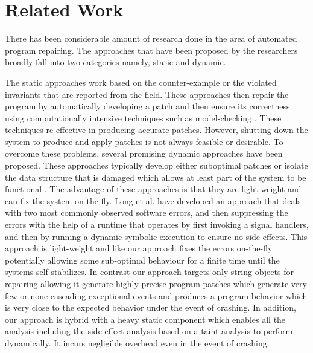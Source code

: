 \section{Related Work}
\label{sec:relatedWork}

There has been considerable amount of research done in the area of 
automated program repairing. The approaches that have been proposed by the researchers
broadly fall into two categories namely, static and dynamic.

The static approaches work based on the counter-example or the violated invariants that
are reported from the field. These approaches then repair the program by automatically developing a patch
and then ensure its correctness using computationally intensive techniques such as model-checking \cite{biere2014, wei-issta-2010}.
These techniques re effective in producing accurate patches. However, shutting down the system to produce and apply patches is not always feasible 
or desirable. To overcome these problems, several promising dynamic approaches have been proposed. These approaches
typically develop either suboptimal patches or isolate the data structure that is damaged which allows at least part of the system
to be functional \cite{conf/issre/DemskyR03, conf/icse/DemskyR05, conf/issta/DemskyEGMPR06}. The advantage of these approaches
is that they are light-weight and can fix the system on-the-fly. Long et al. \cite{conf/pldi/LongSR14} have developed
an approach that deals with two most commonly observed software errors, and then suppressing the errors with the help 
of a runtime that operates by first invoking a  signal handlers, and then by running a dynamic symbolic execution to ensure no side-effects.
This approach is light-weight and like our approach fixes the errors on-the-fly potentially allowing some sub-optimal behaviour for a finite time until the systems self-stabilizes.
In contrast our approach targets only string objects for repairing allowing it generate highly precise program patches which generate very few or none cascading exceptional events and 
produces a program behavior which is very close to the expected behavior under the event of crashing. 
In addition, our approach is hybrid with a heavy static component which enables all the analysis including the side-effect analysis
based on a taint analysis to perform dynamically. It incurs negligible overhead even in the event of crashing.



